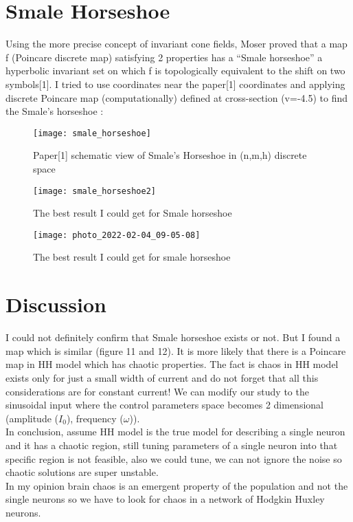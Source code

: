 \documentclass{article}
\begin{document}
		
		
	\section{Smale Horseshoe}
		Using the more precise concept of invariant cone fields, Moser proved that a map f (Poincare discrete map) satisfying
		2 properties has a “Smale horseshoe” a hyperbolic invariant set on which f is topologically
		equivalent to the shift on two symbols[1]. I tried to use coordinates near the paper[1] coordinates and applying discrete Poincare map (computationally) defined at cross-section (v=-4.5) to find the Smale's horseshoe : 
		
				
		\begin{figure}[H]
			\centering
			\texttt{[image: smale\_horseshoe]}
			\caption{Paper[1] schematic view of Smale's Horseshoe in (n,m,h) discrete space}
			\label{fig:smalehorseshoe}
		\end{figure}
		
			
		
		\begin{figure}[H]
			\centering
			\texttt{[image: smale\_horseshoe2]}
			\caption{The best result I could get for Smale horseshoe}
			\label{fig:smalehorseshoe2}
		\end{figure}
	
		\begin{figure}[H]
			\centering
			\texttt{[image: photo\_2022-02-04\_09-05-08]}
			\caption{The best result I could get for smale horseshoe}
			\label{fig:photo2022-02-0409-05-08}
		\end{figure}
	
	
	
	
	\section{Discussion}
		I could not definitely confirm that Smale horseshoe exists or not. But I found a map which is similar (figure 11 and 12). It is more likely that there is a Poincare map in HH model which has chaotic properties. The fact is chaos in HH model exists only for just a small width of current and do not forget that all this considerations are for constant current! We can modify our study to the sinusoidal input where the control parameters space becomes 2 dimensional (amplitude ($I_0$), frequency ($\omega$)).\\
		In conclusion, assume HH model is the true model for describing a single neuron and it has a chaotic region, still tuning parameters of a single neuron into that specific region is not feasible, also we could tune, we can not ignore the noise so chaotic solutions are super unstable.\\ In my opinion brain chaos is an emergent property of the population and not the single neurons so we have to look for chaos in a network of Hodgkin Huxley neurons. 
	
\end{document}

